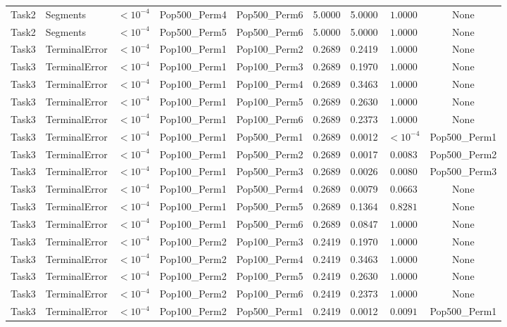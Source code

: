 \documentclass[8pt]{article}
\begin{document}
\begin{longtable}{llccccccc}
Task2 & Segments & $< 10^{-4}$ & Pop500\_Perm4 & Pop500\_Perm6 & 5.0000 & 5.0000 & $1.0000$ & None \\
Task2 & Segments & $< 10^{-4}$ & Pop500\_Perm5 & Pop500\_Perm6 & 5.0000 & 5.0000 & $1.0000$ & None \\
Task3 & TerminalError & $< 10^{-4}$ & Pop100\_Perm1 & Pop100\_Perm2 & 0.2689 & 0.2419 & $1.0000$ & None \\
Task3 & TerminalError & $< 10^{-4}$ & Pop100\_Perm1 & Pop100\_Perm3 & 0.2689 & 0.1970 & $1.0000$ & None \\
Task3 & TerminalError & $< 10^{-4}$ & Pop100\_Perm1 & Pop100\_Perm4 & 0.2689 & 0.3463 & $1.0000$ & None \\
Task3 & TerminalError & $< 10^{-4}$ & Pop100\_Perm1 & Pop100\_Perm5 & 0.2689 & 0.2630 & $1.0000$ & None \\
Task3 & TerminalError & $< 10^{-4}$ & Pop100\_Perm1 & Pop100\_Perm6 & 0.2689 & 0.2373 & $1.0000$ & None \\
Task3 & TerminalError & $< 10^{-4}$ & Pop100\_Perm1 & Pop500\_Perm1 & 0.2689 & 0.0012 & $< 10^{-4}$ & Pop500\_Perm1 \\
Task3 & TerminalError & $< 10^{-4}$ & Pop100\_Perm1 & Pop500\_Perm2 & 0.2689 & 0.0017 & $0.0083$ & Pop500\_Perm2 \\
Task3 & TerminalError & $< 10^{-4}$ & Pop100\_Perm1 & Pop500\_Perm3 & 0.2689 & 0.0026 & $0.0080$ & Pop500\_Perm3 \\
Task3 & TerminalError & $< 10^{-4}$ & Pop100\_Perm1 & Pop500\_Perm4 & 0.2689 & 0.0079 & $0.0663$ & None \\
Task3 & TerminalError & $< 10^{-4}$ & Pop100\_Perm1 & Pop500\_Perm5 & 0.2689 & 0.1364 & $0.8281$ & None \\
Task3 & TerminalError & $< 10^{-4}$ & Pop100\_Perm1 & Pop500\_Perm6 & 0.2689 & 0.0847 & $1.0000$ & None \\
Task3 & TerminalError & $< 10^{-4}$ & Pop100\_Perm2 & Pop100\_Perm3 & 0.2419 & 0.1970 & $1.0000$ & None \\
Task3 & TerminalError & $< 10^{-4}$ & Pop100\_Perm2 & Pop100\_Perm4 & 0.2419 & 0.3463 & $1.0000$ & None \\
Task3 & TerminalError & $< 10^{-4}$ & Pop100\_Perm2 & Pop100\_Perm5 & 0.2419 & 0.2630 & $1.0000$ & None \\
Task3 & TerminalError & $< 10^{-4}$ & Pop100\_Perm2 & Pop100\_Perm6 & 0.2419 & 0.2373 & $1.0000$ & None \\
Task3 & TerminalError & $< 10^{-4}$ & Pop100\_Perm2 & Pop500\_Perm1 & 0.2419 & 0.0012 & $0.0091$ & Pop500\_Perm1 \\

\end{longtable}
\end{document}
